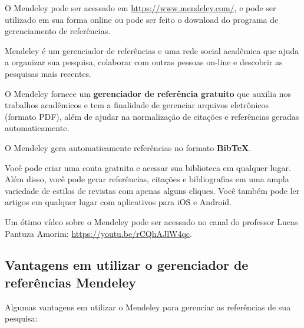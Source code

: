 O Mendeley pode ser acessado em \url{https://www.mendeley.com/}, e pode ser utilizado em sua forma online ou pode ser feito o download do programa de gerenciamento de referências.

Mendeley é um gerenciador de referências e uma rede social acadêmica que ajuda a organizar sua pesquisa, colaborar com outras pessoas on-line e descobrir as pesquisas mais recentes.

\begin{CaixaVerde}
    O Mendeley fornece um {\bf gerenciador de referência gratuito} que auxilia nos trabalhos acadêmicos e tem a finalidade de gerenciar arquivos eletrônicos (formato PDF), além de ajudar na normalização de citações e referências geradas automaticamente.
\end{CaixaVerde}

\begin{CaixaVermelha}
    {\large O Mendeley gera automaticamente referências no formato {\bf BibTeX}.}
\end{CaixaVermelha}

Você pode criar uma conta gratuita e acessar sua biblioteca em qualquer lugar. Além disso, você pode gerar referências, citações e bibliografias em uma ampla variedade de estilos de revistas com apenas alguns cliques. Você também pode ler artigos em qualquer lugar com aplicativos para iOS e Android.

Um ótimo vídeo sobre o Mendeley pode ser acessado no canal do professor Lucas Pantuza Amorim: \url{https://youtu.be/rCQhAJlW4qc}.


\subsection{Vantagens em utilizar o gerenciador de referências Mendeley}

Algumas vantagens em utilizar o Mendeley para gerenciar as referências de sua pesquisa:

